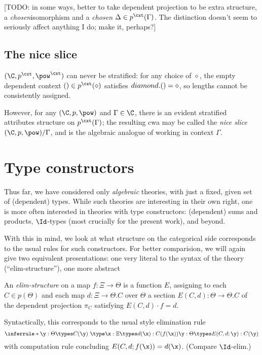 [TODO: in some ways, better to take dependent projection to be extra structure, a \emph{chosen}isomorphism and a \emph{chosen} $\Delta \in p^\cxt(\Gamma)$.  The distinction doesn't seem to seriously affect anything I do; make it, perhaps?]

\subsection*{The nice slice} 

\para $(\C,p^\cxt,\pow^\cxt)$ can never be stratified: for any choice of $\diamond$, the empty dependent context $() \in p^\cxt(\diamond)$ satisfies $\\diamond.() = \diamond$, so lengths cannot be consistently assigned.

However, for any $(\C,p,\pow)$ and $\Gamma \in \C$, there is an evident stratified attributes structure on $p^\cxt(\Gamma)$; the resulting cwa may be called the \emph{nice slice} $(\C,p,\pow)/\Gamma$, and is the algebraic analogue of working in context $\Gamma$.

\section{Type constructors}

Thus far, we have considered only \emph{algebraic} theories, with just a fixed, given set of (dependent) types.  While such theories are interesting in their own right, one is more often interested in theories with type constructors: (dependent) sums and products, $\Id$-types (most crucially for the present work), and beyond.

With this in mind, we look at what structure on the categorical side corresponds to the usual rules for such constructors.  For better comparision, we will again give two equivalent presentations: one very literal to the syntax of the theory (``elim-structure''), one more abstract

\begin{definition}An \emph{elim-structure} on a map $f \colon \Xi \to \Theta$ is a function $E$, assigning to each $C \in p(\Theta)$ and each map $d \colon \Xi \to \Theta.C$ over $\Theta$ a section $E(C,d) \colon \Theta \to \Theta.C$ of the dependent projection $\pi_C$ satisfying $E(C,d) \cdot f = d$.
\end{definition}

Syntactically, this corresponds to the usual style elimination rule
$$\inferrule*{ \y : \Theta \types C(\y)\ \type \\
\x : \Xi \types d(\x) : C(f(\x)) }
{\y : \Theta \types E(C,d;\y) : C(\y)}$$
with computation rule concluding $E(C,d;f(\x)) = d(\x)$.  (Compare $\Id$-elim.)

